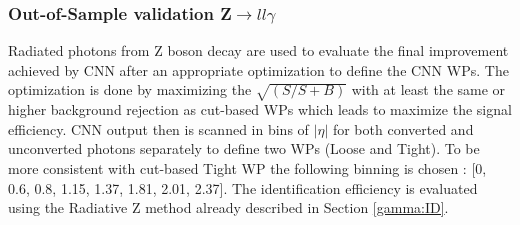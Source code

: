 \subsubsection{Out-of-Sample validation Z$\rightarrow ll\gamma$}
\label{gamma:CNN:Zllg}
Radiated photons from Z boson decay are used to evaluate the final improvement achieved by CNN after an appropriate optimization to define the CNN WPs. The optimization is done by maximizing the $\sqrt{(S/S+B)}$ with at least the same or higher background rejection as cut-based WPs which leads to maximize the signal efficiency. CNN output then is scanned in bins of $|\eta|$ for both converted and unconverted photons separately to define two WPs (Loose and Tight). To be more consistent with cut-based Tight WP the following binning is chosen : [0, 0.6, 0.8, 1.15, 1.37, 1.81, 2.01, 2.37]. The identification efficiency is evaluated using the Radiative Z method already described in Section \ref{gamma:ID}. 
